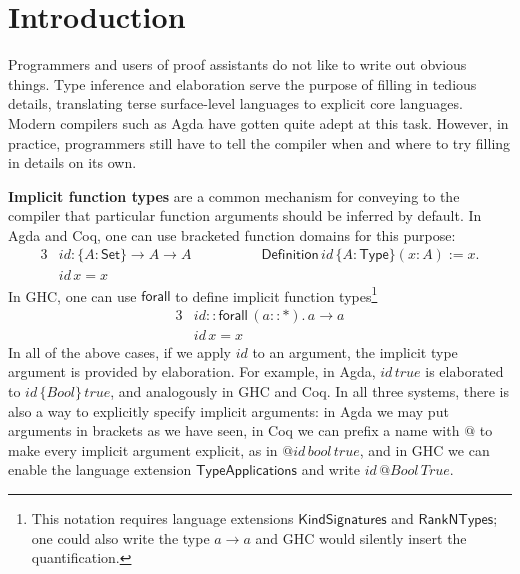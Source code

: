 \documentclass[acmsmall,review,anonymous,prologue,dvipsnames]{acmart}\settopmatter{printfolios=true,printccs=false,printacmref=false}
\newcommand{\kw}[1]{{\mathsf{#1}}}
\theoremstyle{remark}
\begin{document}

\maketitle




\section{Introduction}
\label{sec:introduction}

Programmers and users of proof assistants do not like to write out obvious
things. Type inference and elaboration serve the purpose of filling in tedious
details, translating terse surface-level languages to explicit core
languages. Modern compilers such as Agda have gotten quite adept at this
task. However, in practice, programmers still have to tell the compiler when and
where to try filling in details on its own.

\textbf{Implicit function types} are a common mechanism for conveying to the
compiler that particular function arguments should be inferred by default. In
Agda and Coq, one can use bracketed function domains for this purpose:
\begin{alignat*}{3}
  & id : \{A : \kw{Set}\}\to A \to A \hspace{5em} \kw{Definition}\,id\,\{A : \kw{Type}\}(x : A) := x.\\
  & id\,x = x
\end{alignat*}
In GHC, one can use $\kw{forall}$ to define implicit function
types\footnote{This notation requires language extensions
  $\mathsf{KindSignatures}$ and $\mathsf{RankNTypes}$; one could also write the type
  $a \to a$ and GHC would silently insert the quantification.}
\begin{alignat*}{3}
  & id :: \kw{forall}\,(a :: \kw{*}).\,a \to a\\
  & id\,x = x
\end{alignat*}
In all of the above cases, if we apply $id$ to an argument, the implicit type
argument is provided by elaboration. For example, in Agda, $id\,true$ is
elaborated to $id\,\{Bool\}\,true$, and analogously in GHC and Coq. In all three
systems, there is also a way to explicitly specify implicit arguments: in Agda
we may put arguments in brackets as we have seen, in Coq we can prefix a name
with $\kw{@}$ to make every implicit argument explicit, as in
$\kw{@}id\,bool\,true$, and in GHC we can enable the language extension
$\mathsf{TypeApplications}$ and write $id\,\kw{@}Bool\,True$.
\end{document}

